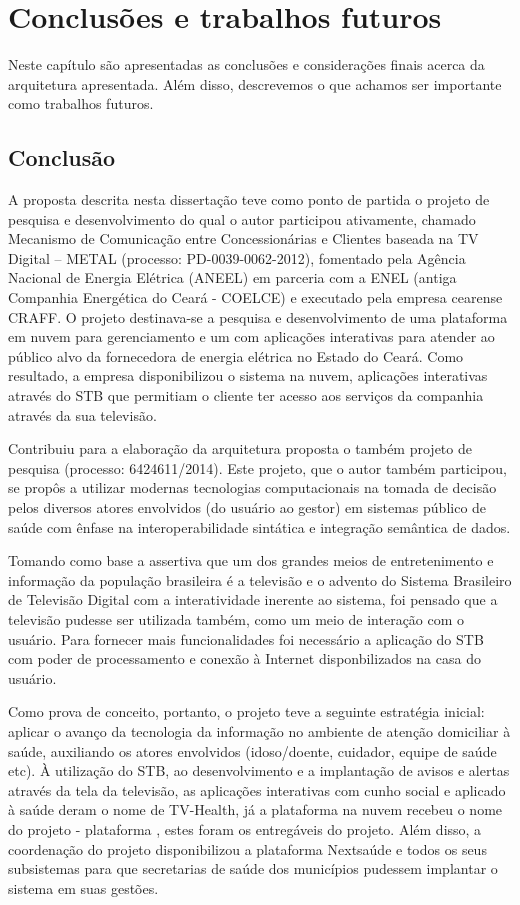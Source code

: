 \chapter{Conclusões e trabalhos futuros}

Neste capítulo são apresentadas as conclusões e considerações finais acerca da
arquitetura apresentada. Além disso, descrevemos o que achamos ser importante
como trabalhos futuros.

\section{Conclusão} \label{sec:conclusao}

A proposta descrita nesta dissertação teve como ponto de partida o projeto de
pesquisa e desenvolvimento do qual o autor participou ativamente, chamado
Mecanismo de Comunicação entre Concessionárias e Clientes baseada na TV Digital
– METAL (processo: PD-0039-0062-2012), fomentado pela Agência Nacional de
Energia Elétrica (ANEEL) em parceria com a ENEL (antiga Companhia Energética do
Ceará - COELCE) e executado pela empresa cearense CRAFF. O projeto destinava-se
a pesquisa e desenvolvimento de uma plataforma em nuvem para gerenciamento e um
\stb[] com aplicações interativas para atender ao público alvo da fornecedora de
energia elétrica no Estado do Ceará. Como resultado, a empresa disponibilizou o
sistema na nuvem, aplicações interativas através do STB que permitiam o cliente
ter acesso aos serviços da companhia através da sua televisão.

Contribuiu para a elaboração da arquitetura proposta o também projeto de
pesquisa \nextsaude[] (processo: 6424611/2014). Este projeto, que o autor também
participou, se propôs a utilizar modernas tecnologias computacionais na tomada
de decisão pelos diversos atores envolvidos (do usuário ao gestor) em sistemas
público de saúde com ênfase na interoperabilidade sintática e integração 
semântica de dados.

Tomando como base a assertiva que um dos grandes meios de entretenimento e
informação da população brasileira é a televisão e o advento do Sistema
Brasileiro de Televisão Digital com a interatividade inerente ao sistema, foi
pensado que a televisão pudesse ser utilizada também, como um meio de interação
com o usuário. Para fornecer mais funcionalidades foi necessário a aplicação do
STB com poder de processamento e conexão à Internet disponbilizados na casa do
usuário.   

Como prova de conceito, portanto, o projeto teve a seguinte estratégia inicial:
aplicar o avanço da tecnologia da informação no ambiente de atenção domiciliar
à saúde, auxiliando os atores envolvidos (idoso/doente, cuidador, equipe de
saúde etc). À utilização do STB, ao desenvolvimento e a implantação de avisos e
alertas através da tela da televisão, as aplicações interativas com cunho
social e aplicado à saúde deram o nome de TV-Health, já a plataforma na nuvem
recebeu o nome do projeto - plataforma \nextsaude, estes foram os entregáveis do
projeto. Além disso, a coordenação do projeto disponibilizou a plataforma
Nextsaúde e todos os seus subsistemas para que secretarias de saúde dos
municípios pudessem implantar o sistema em suas gestões.

